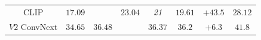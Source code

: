 \begin{table}[!htbp]
{\begin{tabular}{c|cclcccc}
			CLIP                    & $17.09$                                                                       & \textit{\pmb{$24.52$}} & $23.04$          & \textit{21}    & \textit{$19.61$} & {\color[HTML]{009901} $+43.5$}                                              & $28.12$                                                                                   \\
			$V2$ ConvNext             & $34.65$                                                                       & \textit{$36.48$}          & \pmb{$36.84$} & \textit{$36.37$} & \textit{$36.2$}  & {\color[HTML]{009901} $+6.3$}                                               & $41.8$                                                                                    \\ \hline
		\end{tabular}%
	}
\end{table}




